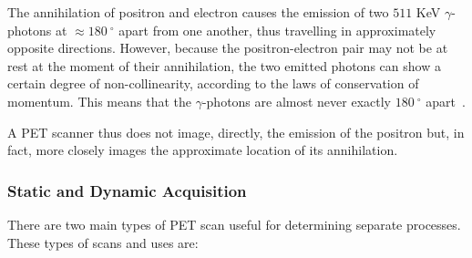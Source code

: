                 The annihilation of positron and electron causes the emission of two $511$ \gls{KeV} $\gamma$-photons at $\approx\SI{180}{^{\circ}}$ apart from one another, thus travelling in approximately opposite directions. However, because the positron-electron pair may not be at rest at the moment of their annihilation, the two emitted photons can show a certain degree of non-collinearity, according to the laws of conservation of momentum. This means that the $\gamma$-photons are almost never exactly $\SI{180}{^{\circ}}$ apart~. %
                
                A \gls{PET} scanner thus does not image, directly, the emission of the positron but, in fact, more closely images the approximate location of its annihilation. %
            
            \subsubsection{Static and Dynamic Acquisition} \label{sec:static_and_dynamic_acquisition}
                There are two main types of \gls{PET} scan useful for determining separate processes. These types of scans and uses are:
                
